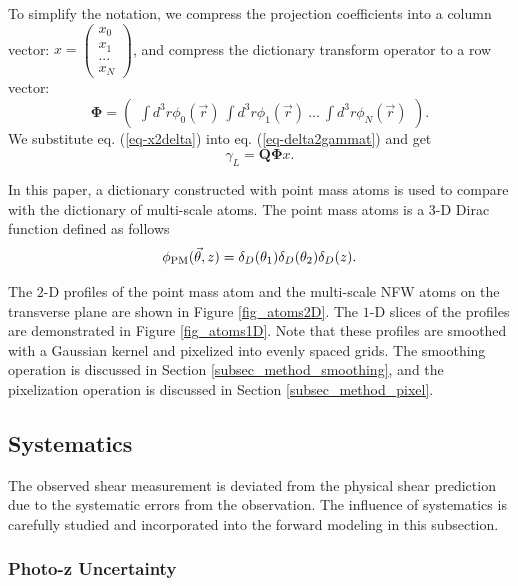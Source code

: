 \documentclass[twocolumn]{aastex63}
\begin{document}
To simplify the notation, we compress the projection coefficients into a column
vector:
$x=\begin{pmatrix}
x_{0}\\
x_{1}\\
...\\
x_{N}
\end{pmatrix}$,
and compress the dictionary transform operator to a row vector:
\begin{equation}
\mathbf{\Phi}=\begin{pmatrix}
\int d^3r\phi_0(\vec{r}) ~\int d^3r \phi_1(\vec{r})~ ...~\int d^3r \phi_{N}(\vec{r})
\end{pmatrix}.
\end{equation}
We substitute eq. (\ref{eq-x2delta}) into eq. (\ref{eq-delta2gammat}) and get
\begin{equation}\label{eq-x2gammat}
\gamma_L=\mathbf{Q}\mathbf{\Phi} x.
\end{equation}

In this paper, a dictionary constructed with point mass atoms is used to
compare with the dictionary of multi-scale atoms. The point mass atoms is a
$3$-D Dirac function defined as follows
\begin{equation}
\phi_{\rm{PM}}(\vec{\theta},z) = \delta_D(\theta_1) \delta_D(\theta_2) \delta_D(z).
\end{equation}

The $2$-D profiles of the point mass atom and the multi-scale NFW atoms on the
transverse plane are shown in Figure \ref{fig_atoms2D}. The $1$-D slices of the
profiles are demonstrated in Figure \ref{fig_atoms1D}. Note that these profiles
are smoothed with a Gaussian kernel and pixelized into evenly spaced grids. The
smoothing operation is discussed in Section \ref{subsec_method_smoothing}, and
the pixelization operation is discussed in Section \ref{subsec_method_pixel}.

\subsection{Systematics}
\label{subsec_method_Systematics}

The observed shear measurement is deviated from the physical shear prediction
due to the systematic errors from the observation. The influence of systematics is
carefully studied and incorporated into the forward modeling in this subsection.

\subsubsection{Photo-z Uncertainty}
\label{subsec_method_photoz}
\end{document}
